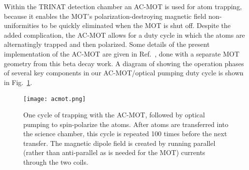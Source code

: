 

Within the \ac{TRINAT} detection chamber an AC-MOT is used for atom trapping, because it enables the \ac{MOT}'s polarization-destroying magnetic field non-uniformities to be quickly eliminated when the \ac{MOT} is shut off.  Despite the added complication, the AC-MOT allows for a duty cycle in which the  atoms are alternatingly trapped and then polarized.
%
Some details of the present implementation of the AC-MOT are given in Ref.~\cite{thesis}, done with a separate MOT geometry from this beta decay work.  A diagram of showing the operation phases of several key components in our AC-MOT/optical pumping duty cycle is shown in Fig.~\ref{fig:acmot}.

\begin{figure}[ht]
	\centering
		\texttt{[image: acmot.png]}
		\caption[The AC-MOT and Optical Pumping Cycle]{One cycle of trapping with the AC-MOT, followed by optical pumping to spin-polarize the atoms.  After atoms are transferred into the science chamber, this cycle is repeated 100 times before the next transfer.  The magnetic dipole field is created by running parallel (rather than anti-parallel as is needed for the MOT) currents through the two coils.}
		\label{fig:acmot}
\end{figure}


%

